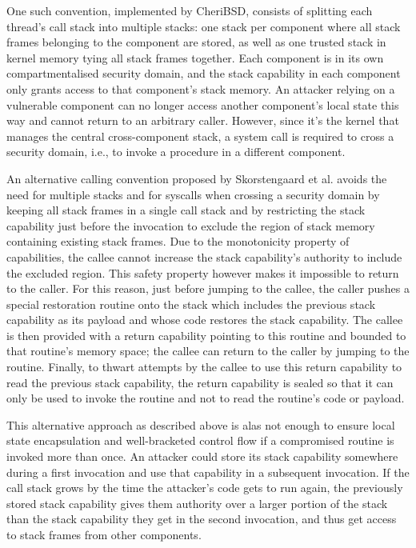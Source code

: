 \documentclass[main.tex]{subfiles}
\begin{document}
One such convention, implemented by CheriBSD, consists of splitting each thread’s call stack into multiple stacks: one stack per component where all stack frames belonging to the component are stored, as well as one trusted stack in kernel memory tying all stack frames together. Each component is in its own compartmentalised security domain, and the stack capability in each component only grants access to that component’s stack memory. An attacker relying on a vulnerable component can no longer access another component’s local state this way and cannot return to an arbitrary caller. However, since it’s the kernel that manages the central cross-component stack, a system call is required to cross a security domain, i.e., to invoke a procedure in a different component.

An alternative calling convention proposed by Skorstengaard et al.\cite{retptr} avoids the need for multiple stacks and for syscalls when crossing a security domain by keeping all stack frames in a single call stack and by restricting the stack capability just before the invocation to exclude the region of stack memory containing existing stack frames. Due to the monotonicity property of capabilities, the callee cannot increase the stack capability’s authority to include the excluded region. This safety property however makes it impossible to return to the caller. For this reason, just before jumping to the callee, the caller pushes a special restoration routine onto the stack which includes the previous stack capability as its payload and whose code restores the stack capability. The callee is then provided with a return capability pointing to this routine and bounded to that routine’s memory space; the callee can return to the caller by jumping to the routine. Finally, to thwart attempts by the callee to use this return capability to read the previous stack capability, the return capability is sealed so that it can only be used to invoke the routine and not to read the routine’s code or payload.

This alternative approach as described above is alas not enough to ensure local state encapsulation and well-bracketed control flow if a compromised routine is invoked more than once. An attacker could store its stack capability somewhere during a first invocation and use that capability in a subsequent invocation. If the call stack grows by the time the attacker’s code gets to run again, the previously stored stack capability gives them authority over a larger portion of the stack than the stack capability they get in the second invocation, and thus get access to stack frames from other components.
\end{document}
